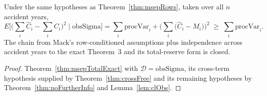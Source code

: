 \begin{theorem}\label{thm:msepTotalRows}\leanok
{}
Under the same hypotheses as Theorem~\ref{thm:msepRows}, taken over all $n$ accident years,
\[
  E\Big[\Big(\sum_i \hat C_i - \sum_i C_i\Big)^2 \;\Big|\; \mathrm{obsSigma}\Big]
  = \sum_i \mathrm{procVar}_i + \Big(\sum_i \big(\hat C_i - M_i\big)\Big)^2
  \;\ge\; \sum_i \mathrm{procVar}_i .
\]
The chain from Mack's row-conditioned assumptions plus independence across accident years to the
exact Theorem~3 and its total-reserve form is closed.
\end{theorem}
\begin{proof}\leanok
Theorem~\ref{thm:msepTotalExact} with $\mathcal{D} = \mathrm{obsSigma}$, its cross-term hypothesis
supplied by Theorem~\ref{thm:crossFree} and its remaining hypotheses by
Theorem~\ref{thm:noFurtherInfo} and Lemma~\ref{lem:clObs}.
\end{proof}

